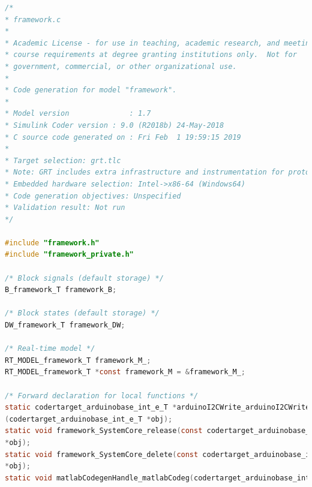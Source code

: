 		\begin{lstlisting}[caption={Automatically generated C code}, language=c,label={lst:acg}]
/*
* framework.c
*
* Academic License - for use in teaching, academic research, and meeting
* course requirements at degree granting institutions only.  Not for
* government, commercial, or other organizational use.
*
* Code generation for model "framework".
*
* Model version              : 1.7
* Simulink Coder version : 9.0 (R2018b) 24-May-2018
* C source code generated on : Fri Feb  1 19:59:15 2019
*
* Target selection: grt.tlc
* Note: GRT includes extra infrastructure and instrumentation for prototyping
* Embedded hardware selection: Intel->x86-64 (Windows64)
* Code generation objectives: Unspecified
* Validation result: Not run
*/

#include "framework.h"
#include "framework_private.h"

/* Block signals (default storage) */
B_framework_T framework_B;

/* Block states (default storage) */
DW_framework_T framework_DW;

/* Real-time model */
RT_MODEL_framework_T framework_M_;
RT_MODEL_framework_T *const framework_M = &framework_M_;

/* Forward declaration for local functions */
static codertarget_arduinobase_int_e_T *arduinoI2CWrite_arduinoI2CWrite
(codertarget_arduinobase_int_e_T *obj);
static void framework_SystemCore_release(const codertarget_arduinobase_int_e_T
*obj);
static void framework_SystemCore_delete(const codertarget_arduinobase_int_e_T
*obj);
static void matlabCodegenHandle_matlabCodeg(codertarget_arduinobase_int_e_T *obj);


\end{lstlisting}
